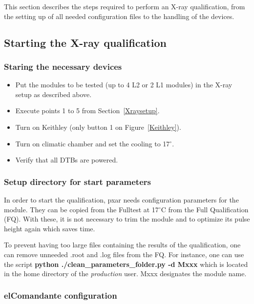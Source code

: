 \documentclass[a4paper,12pt,twoside]{article}
\begin{document}
This section describes the steps required to perform an X-ray qualification, from the setting up of all needed configuration files to the handling of the devices. 

\subsection{Starting the X-ray qualification}

\subsubsection{Staring the necessary devices}

\begin{itemize}
\item Put the modules to be tested (up to 4 L2 or 2 L1 modules) in the X-ray setup as described above.
\item Execute points 1 to 5 from Section~\ref{Xraysetup}.
\item Turn on Keithley (only button 1 on Figure~\ref{Keithley}).
\item Turn on climatic chamber and set the cooling to 17$^{\circ}$.
\item Verify that all DTBs are powered.
\end{itemize}

\subsubsection{Setup directory for start parameters}

In order to start the qualification, pxar needs configuration parameters for the module. They can be copied from the Fulltest at 17$^\circ$C from the Full Qualification (FQ). With these, it is not necessary to trim the module and to optimize its pulse height again which saves time.

To prevent having too large files containing the results of the qualification, one can remove unneeded .root and .log files from the FQ. For instance, one can use the script \textbf{python ./clean\_parameters\_folder.py -d Mxxx} which is located in the home directory of the \textit{production} user. Mxxx designates the module name. \\


\subsubsection{elComandante configuration}
\end{document}
